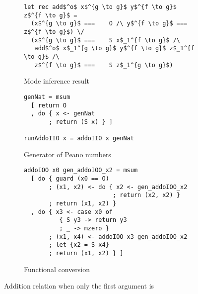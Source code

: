 \begin{figure}[h]
  \centering
  \begin{subfigure}[b]{0.45\textwidth}
    \begin{lstlisting}[frame=tb]
let rec add$^o$ x$^{g \to g}$ y$^{f \to g}$ z$^{f \to g}$ =
  (x$^{g \to g}$ ===    O /\ y$^{f \to g}$ ===    z$^{f \to g}$) \/
  (x$^{g \to g}$ ===    S x$_1^{f \to g}$ /\
   add$^o$ x$_1^{g \to g}$ y$^{f \to g}$ z$_1^{f \to g}$ /\
   z$^{f \to g}$ ===    S z$_1^{g \to g}$)
    \end{lstlisting}
   \caption{Mode inference result}
    \label{fig:addo_modded}
  \end{subfigure}
  \hfill
  \begin{subfigure}[b]{0.45\textwidth}
    \begin{lstlisting}[frame=tb]
genNat = msum
  [ return O
  , do { x <- genNat
       ; return (S x) } ]

runAddoIIO x = addoIIO x genNat
    \end{lstlisting}
   \caption{Generator of Peano numbers}
    \label{fig:addo_gen}
  \end{subfigure}

  \hfill

  \begin{subfigure}[b]{0.61\textwidth}
    \begin{lstlisting}[frame=tb]
addoIOO x0 gen_addoIOO_x2 = msum
  [ do { guard (x0 == O)
       ; (x1, x2) <- do { x2 <- gen_addoIOO_x2
                         ; return (x2, x2) }
       ; return (x1, x2) }
  , do { x3 <- case x0 of
          { S y3 -> return y3
          ; _ -> mzero }
       ; (x1, x4) <- addoIOO x3 gen_addoIOO_x2
       ; let {x2 = S x4}
       ; return (x1, x2) } ]

    \end{lstlisting}
    \caption{Functional conversion}
    \label{fig:addo_hsk}
  \end{subfigure}
  \caption{Addition relation when only the first argument is \inm}
  \label{fig:addo}
\end{figure}
